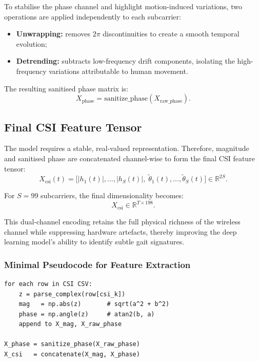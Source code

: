To stabilise the phase channel and highlight motion-induced variations, two
operations are applied independently to each subcarrier:

\begin{itemize}
    \item \textbf{Unwrapping:} removes \(2\pi\) discontinuities to create a smooth
          temporal evolution;
    \item \textbf{Detrending:} subtracts low-frequency drift components, isolating
          the high-frequency variations attributable to human movement.
\end{itemize}

The resulting sanitised phase matrix is:
\[
X_{\text{phase}} = \text{sanitize\_phase}(X_{\text{raw\_phase}}).
\]

\subsection{Final CSI Feature Tensor}

The model requires a stable, real-valued representation. Therefore, magnitude
and sanitised phase are concatenated channel-wise to form the final CSI feature
tensor:
\[
X_{\text{csi}}(t)
=
\Big[
|h_1(t)|, \dots, |h_S(t)|,\;
\tilde{\theta}_1(t), \dots, \tilde{\theta}_S(t)
\Big]
\in \mathbb{R}^{2S}.
\]

For \(S=99\) subcarriers, the final dimensionality becomes:
\[
X_{\text{csi}} \in \mathbb{R}^{T \times 198}.
\]

This dual-channel encoding retains the full physical richness of the wireless
channel while suppressing hardware artefacts, thereby improving the deep
learning model’s ability to identify subtle gait signatures.

\subsubsection*{Minimal Pseudocode for Feature Extraction}

\begin{verbatim}
for each row in CSI CSV:
    z = parse_complex(row[csi_k])
    mag   = np.abs(z)       # sqrt(a^2 + b^2)
    phase = np.angle(z)     # atan2(b, a)
    append to X_mag, X_raw_phase

X_phase = sanitize_phase(X_raw_phase)
X_csi   = concatenate(X_mag, X_phase)
\end{verbatim}


